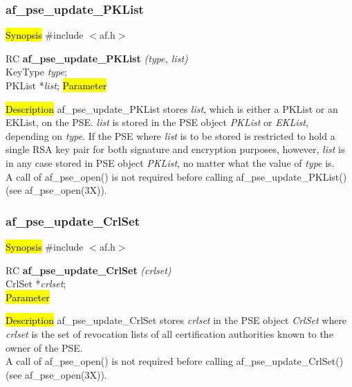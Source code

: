 \subsubsection{af\_pse\_update\_PKList}
\label{af_update_PKList}
\hl{Synopsis}
\#include $<$af.h$>$

RC {\bf af\_pse\_update\_PKList} {\em (type, list)} \\
KeyType {\em type}; \\
PKList *{\em list};
\hl{Parameter}


\hl{Description}
af\_pse\_update\_PKList stores {\em list}, which is either a PKList or an EKList, 
on the PSE. {\em list} is stored in the PSE object {\em PKList} or {\em EKList}, depending
on {\em type}.
If the PSE where {\em list} is to be stored is restricted to hold a single RSA key pair
for both signature and encryption purposes, however, {\em list} is in any case stored in PSE object {\em PKList}, no
matter what the value of {\em type} is.
\\ [1em]
A call of af\_pse\_open() is not required before calling af\_pse\_update\_PKList()
(see af\_pse\_open(3X)).

\subsubsection{af\_pse\_update\_CrlSet}
\label{af_update_CrlSet}
\hl{Synopsis}
\#include $<$af.h$>$

RC {\bf af\_pse\_update\_CrlSet} {\em (crlset)} \\
CrlSet *{\em crlset}; \\
\hl{Parameter}

\hl{Description}
af\_pse\_update\_CrlSet stores {\em crlset} in the PSE object {\em CrlSet} 
where {\em crlset} is the set of revocation lists of all certification authorities 
known to the owner of the PSE.
\\ [1em]
A call of af\_pse\_open() is not required before calling af\_pse\_update\_CrlSet()
(see af\_pse\_open(3X)).


